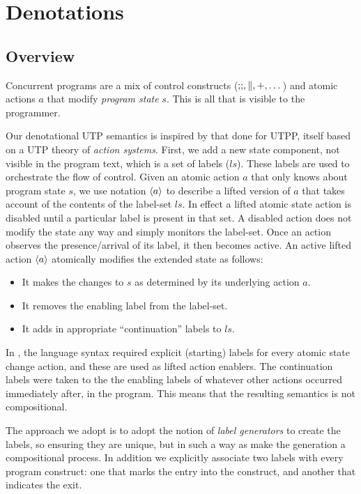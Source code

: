 \section{Denotations}\label{sec:denote}

\subsection{Overview}


Concurrent programs are a mix of control constructs ($\mathbin{;\!;},\parallel,+,\dots$)
and atomic actions $a$ that modify \emph{program state} $s$.
This is all that is visible to the programmer.



Our denotational UTP semantics
is inspired by that done for UTPP\cite{DBLP:conf/icfem/WoodcockH02},
itself based on a UTP theory of \emph{action systems}.
First, we add a new state component, not visible in the program text,
which is a set of labels ($ls$).
These labels are used to orchestrate the flow of control.
Given an atomic action $a$ that only knows about program state $s$,
we use notation $\langle a\rangle$ to describe a lifted version
of $a$ that takes account of the contents of the label-set $ls$.
In effect a lifted atomic state action is disabled until
a particular label is present in that set.
A disabled action does not modify the state any way
and simply monitors the label-set.
Once an action observes the presence/arrival of its label,
it then becomes active.
An active lifted action $\langle a\rangle$ atomically modifies the extended state as follows:
\begin{itemize}
  \item It makes the changes to $s$ as determined by its underlying action $a$.
  \item It removes the enabling label from the label-set.
  \item It adds in appropriate ``continuation'' labels to $ls$.
\end{itemize}
In \cite{DBLP:conf/icfem/WoodcockH02},
the language syntax required explicit (starting) labels
for every atomic state change action,
and these are used as lifted action enablers.
The continuation labels were taken to the the enabling labels
of whatever other actions occurred immediately after, in the program.
This means that the resulting semantics is not compositional.

The approach we adopt is to adopt the notion of \emph{label generators}
to create the labels, so ensuring they are unique,
but in such a way as make the generation a compositional process.
In addition we explicitly associate two labels with every program construct:
one that marks the entry into the construct,
and another that indicates the exit.

